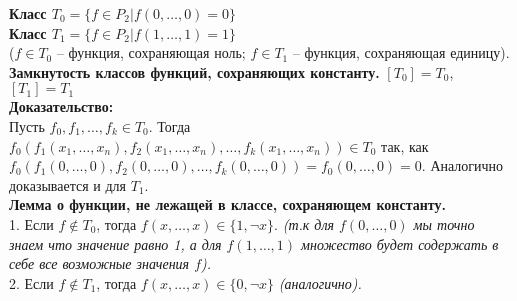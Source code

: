 \textbf{Класс $T_0 = \{f \in P_2 | f(0, \ldots, 0) = 0\}$}\\

\textbf{Класс $T_1 = \{f \in P_2 | f(1, \ldots, 1) = 1\}$}\\

($f \in T_0$ -- функция, сохраняющая ноль; $f \in T_1$ -- функция, сохраняющая единицу).\\

\textbf{Замкнутость классов функций, сохраняющих константу.} $[T_0] = T_0$, $[T_1] = T_1$\\

\noindent \textbf{Доказательство:}\\

Пусть $f_0, f_1, \ldots, f_k \in T_0$. Тогда $f_0 (f_1(x_1, \ldots, x_n), f_2(x_1, \ldots, x_n), \ldots, f_k(x_1, \ldots, x_n)) \in T_0$ так, как $f_0 (f_1 (0, \ldots, 0), f_2 (0, \ldots, 0), \ldots, f_k (0, \ldots, 0)) = f_0 (0, \ldots, 0) = 0$.
Аналогично доказывается и для $T_1$.\\

\textbf{Лемма о функции, не лежащей в классе, сохраняющем константу.}\\

1. Если $f \notin T_0$, тогда $f (x, \ldots, x) \in \{1, \neg x\}$. \textit{(т.к для $f (0, \ldots, 0)$ мы точно знаем что значение равно 1, а для $f (1, \ldots, 1)$ множество будет содержать в себе все возможные значения $f$).}\\

2. Если $f \notin T_1$, тогда $f (x, \ldots, x) \in \{0, \neg x\}$ \textit {(аналогично).}
